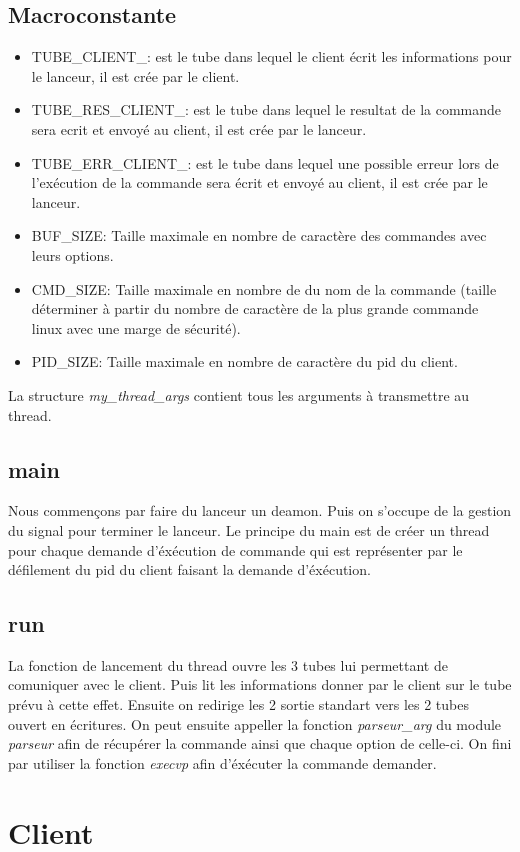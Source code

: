\documentclass[12pt]{article}
\begin{document}
\subsection{Macroconstante}
\begin{itemize}
      \item TUBE\_CLIENT\_: est le tube dans lequel le client écrit les
            informations
            pour le lanceur, il est crée par le client.
      \item TUBE\_RES\_CLIENT\_: est le tube dans lequel le resultat de la
            commande
            sera ecrit et envoyé au client, il est crée par le lanceur.
      \item TUBE\_ERR\_CLIENT\_: est le tube dans lequel une possible erreur
            lors
            de l'exécution de la commande sera écrit et envoyé au client, il
            est
            crée par le lanceur.
      \item BUF\_SIZE: Taille maximale en nombre de caractère des commandes
            avec
            leurs options.
      \item CMD\_SIZE: Taille maximale en nombre de  du nom de la commande
            (taille déterminer à partir du nombre de caractère de la plus
            grande
            commande
            linux avec une marge de sécurité).
      \item PID\_SIZE: Taille maximale en nombre de caractère du pid du client.
\end{itemize}
La structure \textit{my\_thread\_args} contient tous les arguments à
transmettre au thread.
\subsection{main}
Nous commençons par faire du lanceur un deamon. Puis on s'occupe de la gestion
du signal pour
terminer le lanceur.
Le principe du main est de créer un thread pour chaque demande d'éxécution de
commande qui est représenter par le défilement du pid du client faisant la
demande d'éxécution.
\subsection{run}
La fonction de lancement du thread ouvre les 3 tubes lui permettant de
comuniquer
avec le client. Puis lit les informations donner par le client sur le tube
prévu
à cette effet. Ensuite on redirige les 2 sortie standart vers les 2 tubes
ouvert en écritures. On peut ensuite appeller la fonction \textit{parseur\_arg}
du module \textit{parseur} afin de récupérer la commande ainsi que chaque
option de celle-ci. On fini par utiliser la fonction \textit{execvp} afin
d'éxécuter la commande demander.

\section{Client}
\end{document}
